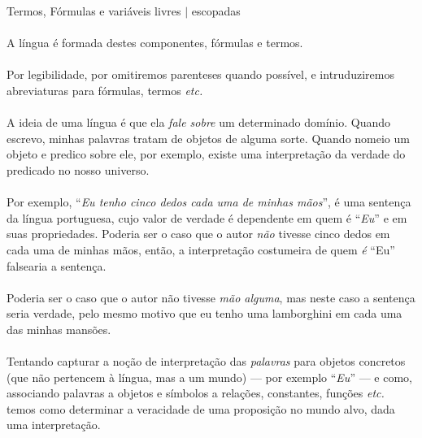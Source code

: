 \begin{definition}{Termos, Fórmulas e variáveis livres ${\vert}$ escopadas}
\begin{enumerate}[label=(\alph*)]
        \end{enumerate}
        \paragraph{}
            A língua é formada destes componentes, fórmulas e termos.
    \end{definition}
    
    \paragraph{}
        Por legibilidade, por omitiremos parenteses quando possível, e 
        intruduziremos abreviaturas para fórmulas, termos \emph{etc.}
    \paragraph{}
        A ideia de uma língua é que ela \emph{fale sobre} um determinado
        domínio. Quando escrevo, minhas palavras tratam de objetos de alguma 
        sorte. Quando nomeio um objeto e predico sobre ele, por exemplo, 
        existe uma interpretação da verdade do predicado no nosso universo.
    \paragraph{}
        Por exemplo, ``\emph{Eu tenho cinco dedos cada uma de minhas mãos}'',
        é uma sentença da língua portuguesa, cujo valor de verdade é dependente
        em quem é ``\emph{Eu}'' e em suas propriedades. Poderia ser o caso que
        o autor {\emph{não}} tivesse cinco dedos em cada uma de minhas mãos, então,
        a interpretação costumeira de quem \emph{é} ``Eu'' falsearia a sentença.
    \paragraph{}
        Poderia ser o caso que o autor não tivesse \emph{mão alguma}, mas neste 
        caso a sentença seria verdade, pelo mesmo motivo que eu tenho uma 
        lamborghini em cada uma das minhas mansões.
    \paragraph{}
        Tentando capturar a noção de interpretação das \emph{palavras} para 
        objetos concretos (que não pertencem à língua, mas a um mundo) --- 
        por exemplo ``\emph{Eu}'' --- e como, associando palavras a objetos e 
        símbolos a relações, constantes, funções \emph{etc.} temos como 
        determinar a veracidade de uma proposição no mundo alvo, dada uma 
        interpretação.
    
